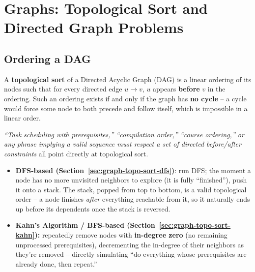 \chapter{Graphs: Topological Sort and Directed Graph Problems}

\section{Ordering a DAG}
\label{sec:graph-topo-intro}

A \textbf{topological sort} of a Directed Acyclic Graph (DAG) is a
linear ordering of its nodes such that for every directed edge
$u \to v$, $u$ appears \textbf{before} $v$ in the ordering. Such an
ordering exists if and only if the graph has \textbf{no cycle} -- a
cycle would force some node to both precede and follow itself,
which is impossible in a linear order.

\begin{patternbox}
\emph{``Task scheduling with prerequisites,'' ``compilation order,''
``course ordering,'' or any phrase implying a valid sequence must
respect a set of directed before/after constraints} all point directly
at topological sort.
\end{patternbox}

\begin{ideabox}
\begin{itemize}
  \item \textbf{DFS-based (Section~\ref{sec:graph-topo-sort-dfs})}: run
        DFS; the moment a node has no more unvisited neighbors to
        explore (it is fully ``finished''), push it onto a stack. The
        stack, popped from top to bottom, is a valid topological order
        -- a node finishes \emph{after} everything reachable from it,
        so it naturally ends up before its dependents once the stack
        is reversed.
  \item \textbf{Kahn's Algorithm / BFS-based (Section~\ref{sec:graph-topo-sort-kahn}):}
        repeatedly remove nodes with \textbf{in-degree zero} (no
        remaining unprocessed prerequisites), decrementing the
        in-degree of their neighbors as they're removed -- directly
        simulating ``do everything whose prerequisites are already
        done, then repeat.''
\end{itemize}
\end{ideabox}

